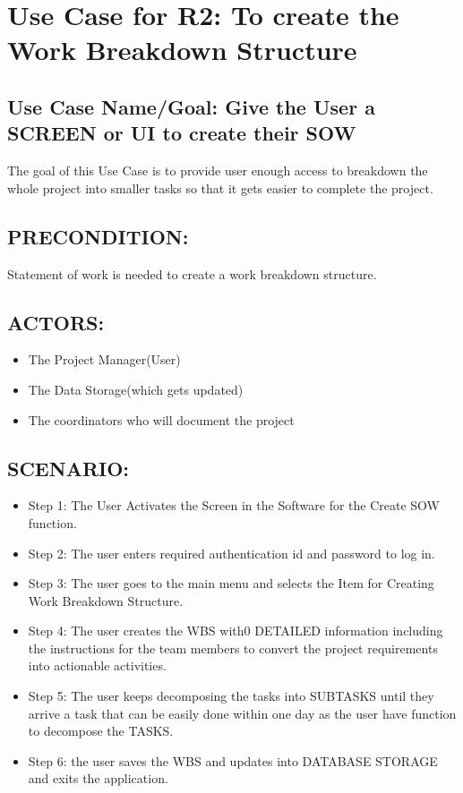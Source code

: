 \documentclass[10pt]{article}
\begin{document}
\section{Use Case for R2: To create the Work Breakdown Structure  }

\subsection{Use Case Name/Goal: Give the User a SCREEN or UI to create their SOW}
The goal of this Use Case is to provide user enough access to breakdown the whole project into smaller tasks so that it gets easier to complete the project.
\subsection{ PRECONDITION:}
 Statement of work is needed to create a work breakdown structure.
\subsection{ACTORS:}
\begin{itemize}
  \item   The Project Manager(User)
  \item  The Data Storage(which gets updated)
 \item The coordinators who will document the project

\end{itemize}
						

\subsection{SCENARIO: }

\begin{itemize}
  \item Step 1: The User Activates the Screen in the Software for the Create SOW function.
  \item Step 2: The user enters required authentication id and password to log in.
  \item Step 3: The user goes to the main menu and selects the Item for Creating Work Breakdown Structure.
\item  Step 4: The user creates the WBS with0 DETAILED information including the instructions for the team members to convert the project requirements into actionable activities.
\item Step 5: The user keeps decomposing the tasks into SUBTASKS until they arrive a task that can be easily done within one day as the user have function to decompose the TASKS.
\item Step 6: the user saves the WBS and updates into DATABASE STORAGE and exits the application. 
\end{itemize}
\end{document}

